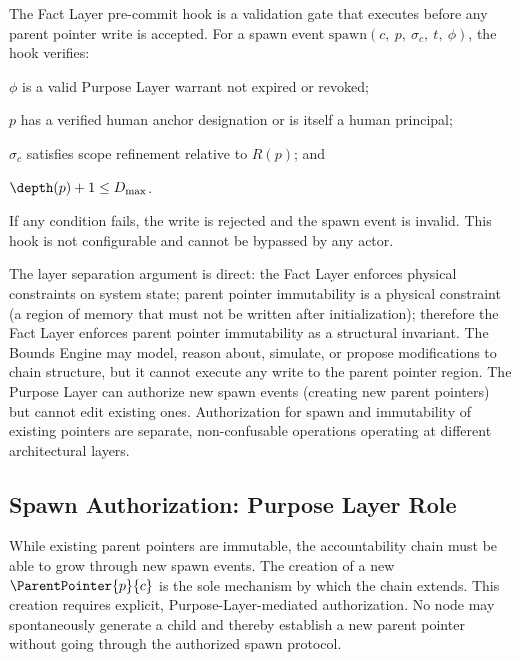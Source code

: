 \begin{dfn}
\label{def:fact-layer-precommit}
The Fact Layer pre-commit hook is a validation gate that executes before any parent pointer write is accepted. For a spawn event $\mathrm{spawn}(c,\ p,\ \sigma_c,\ t,\ \phi)$, the hook verifies:
\begin{inparaenum}[(i)]
    \item $\phi$ is a valid Purpose Layer warrant not expired or revoked;
    \item $p$ has a verified human anchor designation or is itself a human principal;
    \item $\sigma_c$ satisfies scope refinement relative to $R(p)$; and
    \item $\depth(p) + 1 \leq D_{\max}$.
\end{inparaenum}
If any condition fails, the write is rejected and the spawn event is invalid. This hook is not configurable and cannot be bypassed by any actor.
\end{dfn}

The layer separation argument is direct: the Fact Layer enforces physical constraints on system state; parent pointer immutability is a physical constraint (a region of memory that must not be written after initialization); therefore the Fact Layer enforces parent pointer immutability as a structural invariant. The Bounds Engine may model, reason about, simulate, or propose modifications to chain structure, but it cannot execute any write to the parent pointer region. The Purpose Layer can authorize new spawn events (creating new parent pointers) but cannot edit existing ones. Authorization for spawn and immutability of existing pointers are separate, non-confusable operations operating at different architectural layers.

\subsection{Spawn Authorization: Purpose Layer Role}
\label{sec:purpose-layer-spawn-authorization}

While existing parent pointers are immutable, the accountability chain must be able to grow through new spawn events. The creation of a new $\ParentPointer{p}{c}$ is the sole mechanism by which the chain extends. This creation requires explicit, Purpose-Layer-mediated authorization. No node may spontaneously generate a child and thereby establish a new parent pointer without going through the authorized spawn protocol.

